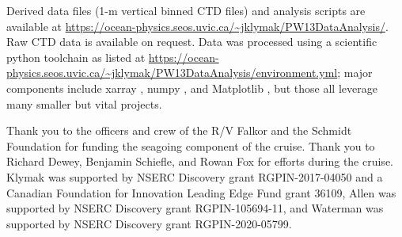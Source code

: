 \documentclass[draft]{agujournal2019}
\begin{document}
Derived data files (1-m vertical binned CTD files) and analysis scripts are available at \url{https://ocean-physics.seos.uvic.ca/~jklymak/PW13DataAnalysis/}.  Raw CTD data is available on request.  Data was processed using a scientific python toolchain as listed at \url{https://ocean-physics.seos.uvic.ca/~jklymak/PW13DataAnalysis/environment.yml}; major
components include xarray \cite{xarray}, numpy \cite{numpy}, and Matplotlib \cite{Matplotlib36}, but those all leverage many smaller but vital projects.

\acknowledgments

Thank you to the officers and crew of the R/V Falkor and the Schmidt Foundation for funding the seagoing component of the cruise.  Thank you to Richard Dewey, Benjamin Schiefle, and Rowan Fox for efforts during the cruise.  Klymak was supported by NSERC Discovery grant RGPIN-2017-04050 and a Canadian Foundation for Innovation Leading Edge Fund grant 36109, Allen was supported by NSERC Discovery grant RGPIN-105694-11, and Waterman was supported by NSERC Discovery grant RGPIN-2020-05799.


\end{document}
